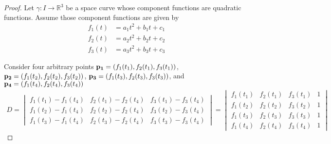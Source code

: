 \begin{proof}
	Let $\gamma: I \to \mathbb{R}^{3}$ be a space curve whose component functions are quadratic functions. Assume those component functions are given by
	\begin{align*}
		f_{1}(t) & = a_{1}t^{2} + b_{1}t + c_{1} \\
		f_{2}(t) & = a_{2}t^{2} + b_{2}t + c_{2} \\
		f_{3}(t) & = a_{3}t^{2} + b_{3}t + c_{3}
	\end{align*}

	Consider four arbitrary points $\mathbf{p_{1}} = \left({f_{1}(t_{1}), f_{2}(t_{1}), f_{3}(t_{1})}\right)$, $\mathbf{p_{2}} = \left({f_{1}(t_{2}), f_{2}(t_{2}), f_{3}(t_{2})}\right)$, $\mathbf{p_{3}} = \left({f_{1}(t_{3}), f_{2}(t_{3}), f_{3}(t_{3})}\right)$, and $\mathbf{p_{4}} = \left({f_{1}(t_{4}), f_{2}(t_{4}), f_{3}(t_{4})}\right)$
	\begin{align*}
		D = \begin{vmatrix}
			    f_{1}(t_{1}) - f_{1}(t_{4}) & f_{2}(t_{1}) - f_{2}(t_{4}) & f_{3}(t_{1}) - f_{3}(t_{4}) \\
			    f_{1}(t_{2}) - f_{1}(t_{4}) & f_{2}(t_{2}) - f_{2}(t_{4}) & f_{3}(t_{2}) - f_{3}(t_{4}) \\
			    f_{1}(t_{3}) - f_{1}(t_{4}) & f_{2}(t_{3}) - f_{2}(t_{4}) & f_{3}(t_{3}) - f_{3}(t_{4})
		    \end{vmatrix} = \begin{vmatrix}
			                    f_{1}(t_{1}) & f_{2}(t_{1}) & f_{3}(t_{1}) & 1 \\
			                    f_{1}(t_{2}) & f_{2}(t_{2}) & f_{3}(t_{2}) & 1 \\
			                    f_{1}(t_{3}) & f_{2}(t_{3}) & f_{3}(t_{3}) & 1 \\
			                    f_{1}(t_{4}) & f_{2}(t_{4}) & f_{3}(t_{4}) & 1
		                    \end{vmatrix}
	\end{align*}


\end{proof}
